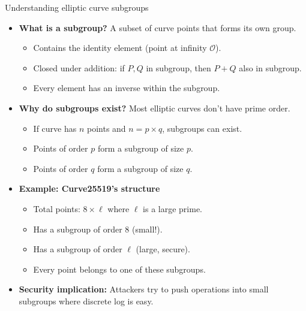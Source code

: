 \documentclass[aspectratio=169, lualatex, handout]{beamer}
\begin{document}
\begin{frame}{Understanding elliptic curve subgroups}
	\begin{itemize}[<+->]
		\item \textbf{What is a subgroup?} A subset of curve points that forms its own group.
		      \begin{itemize}
			      \item Contains the identity element (point at infinity $\mathcal{O}$).
			      \item Closed under addition: if $P, Q$ in subgroup, then $P + Q$ also in subgroup.
			      \item Every element has an inverse within the subgroup.
		      \end{itemize}
		\item \textbf{Why do subgroups exist?} Most elliptic curves don't have prime order.
		      \begin{itemize}
			      \item If curve has $n$ points and $n = p \times q$, subgroups can exist.
			      \item Points of order $p$ form a subgroup of size $p$.
			      \item Points of order $q$ form a subgroup of size $q$.
		      \end{itemize}
		\item \textbf{Example: Curve25519's structure}
		      \begin{itemize}
			      \item Total points: $8 \times \ell$ where $\ell$ is a large prime.
			      \item Has a subgroup of order 8 (small!).
			      \item Has a subgroup of order $\ell$ (large, secure).
			      \item Every point belongs to one of these subgroups.
		      \end{itemize}
		\item \textbf{Security implication:} Attackers try to push operations into small subgroups where discrete log is easy.
	\end{itemize}
\end{frame}
\end{document}
